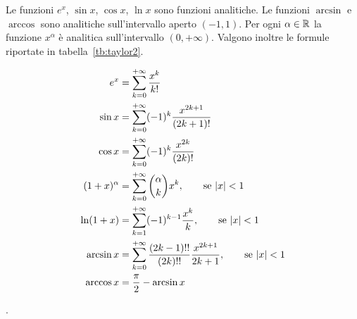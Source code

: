 \begin{theorem}
  \label{th:serie_taylor}
  Le funzioni $e^x$, $\sin x$, $\cos x$, $\ln x$ sono funzioni
  analitiche. Le funzioni $\arcsin$ e $\arccos$ sono analitiche sull'intervallo
  aperto $(-1,1)$. Per ogni $\alpha \in \mathbb R$
  la funzione $x^\alpha$ è analitica sull'intervallo $(0,+\infty)$.
  Valgono inoltre le formule riportate in tabella~\ref{tb:taylor2}.
\end{theorem}
%
\begin{table}
\begin{align*}
e^x &= \sum_{k=0}^{+\infty} \frac{x^k}{k!}\\
\sin x &= \sum_{k=0}^{+\infty} (-1)^k\frac{x^{2k+1}}{(2k+1)!}\\
\cos x &= \sum_{k=0}^{+\infty} (-1)^k\frac{x^{2k}}{(2k)!}\\
(1+x)^\alpha &= \sum_{k=0}^{+\infty} {\alpha \choose k} x^k, \qquad \text{se ${\left|x\right|}<1$} \\
\ln (1+x) &= \sum_{k=1}^{+\infty} (-1)^{k-1} \frac{x^k}{k}, \qquad \text{se ${\left|x\right|}<1$} \\
\arcsin x &= \sum_{k=0}^{+\infty} \frac{(2k-1)!!}{(2k)!!} \frac{x^{2k+1}}{2k+1}, \qquad \text{se ${\left|x\right|}< 1$} \\
\arccos x &= \frac \pi 2 - \arcsin x
\end{align*}
\caption{sviluppi in serie di Taylor, di alcune funzioni elementari.
%
%
Si veda il teorema~\ref{th:serie_taylor}}.
\label{tb:taylor2}%
\end{table}
%
